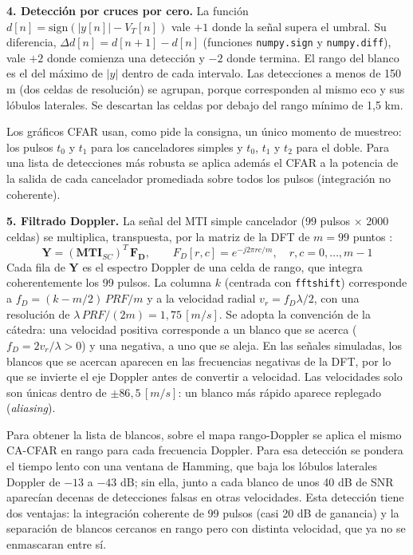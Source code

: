 \textbf{4. Detección por cruces por cero.} La función $d[n] = \mathrm{sign}(|y[n]| - V_T[n])$ vale $+1$ donde la señal supera el umbral. Su diferencia, $\Delta d[n] = d[n+1] - d[n]$ (funciones \texttt{numpy.sign} y \texttt{numpy.diff}), vale $+2$ donde comienza una detección y $-2$ donde termina. El rango del blanco es el del máximo de $|y|$ dentro de cada intervalo. Las detecciones a menos de 150 m (dos celdas de resolución) se agrupan, porque corresponden al mismo eco y sus lóbulos laterales. Se descartan las celdas por debajo del rango mínimo de 1,5 km.

Los gráficos CFAR usan, como pide la consigna, un único momento de muestreo: los pulsos $t_0$ y $t_1$ para los canceladores simples y $t_0$, $t_1$ y $t_2$ para el doble. Para una lista de detecciones más robusta se aplica además el CFAR a la potencia de la salida de cada cancelador promediada sobre todos los pulsos (integración no coherente).

\textbf{5. Filtrado Doppler.} La señal del MTI simple cancelador (99 pulsos $\times$ 2000 celdas) se multiplica, transpuesta, por la matriz de la DFT de $m = 99$ puntos \cite{consigna}:
\begin{equation}
    \mathbf{Y} = (\mathbf{MTI}_{SC})^T \, \mathbf{F_D},
    \qquad
    F_D[r, c] = e^{-j 2\pi r c / m}, \quad r, c = 0, \dots, m-1
\end{equation}
Cada fila de $\mathbf{Y}$ es el espectro Doppler de una celda de rango, que integra coherentemente los 99 pulsos. La columna $k$ (centrada con \texttt{fftshift}) corresponde a $f_D = (k - m/2) \, PRF/m$ y a la velocidad radial $v_r = f_D \lambda/2$, con una resolución de $\lambda \, PRF/(2m) = 1{,}75 \, [m/s]$. Se adopta la convención de la cátedra: una velocidad positiva corresponde a un blanco que se acerca ($f_D = 2v_r/\lambda > 0$) y una negativa, a uno que se aleja. En las señales simuladas, los blancos que se acercan aparecen en las frecuencias negativas de la DFT, por lo que se invierte el eje Doppler antes de convertir a velocidad. Las velocidades solo son únicas dentro de $\pm 86{,}5 \, [m/s]$: un blanco más rápido aparece replegado (\textit{aliasing}).

Para obtener la lista de blancos, sobre el mapa rango-Doppler se aplica el mismo CA-CFAR en rango para cada frecuencia Doppler. Para esa detección se pondera el tiempo lento con una ventana de Hamming, que baja los lóbulos laterales Doppler de $-13$ a $-43$ dB; sin ella, junto a cada blanco de unos 40 dB de SNR aparecían decenas de detecciones falsas en otras velocidades. Esta detección tiene dos ventajas: la integración coherente de 99 pulsos (casi 20 dB de ganancia) y la separación de blancos cercanos en rango pero con distinta velocidad, que ya no se enmascaran entre sí.

